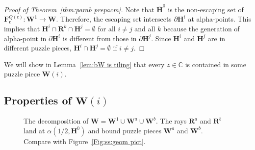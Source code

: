 \documentclass{amsart}
\newcommand{\1}{{\mathbb 1 }}
\newcommand{\bF}{{\mathbf F}}
\newcommand{\bW}{{\mathbf W}}
\newcommand{\bR}{{\mathbf R}}
\newcommand{\bH}{{\mathbf H}}
\newcommand{\rr}{\mathfrak{r}}
\newcommand{\C}{\mathbb{C}}
\theoremstyle{remark}
\numberwithin{equation}{section}
\theoremstyle{definition}
\theoremstyle{nonumberbreak}
\begin{document}
\begin{proof}[Proof of Theorem~\ref{thm:parab prepacm}]
 
Note that $\overline \bH^0$ is the non-escaping set of $\bF^{Q(\rr)}_\rr\colon \bW^1\to \bW.$ Therefore, the escaping set intersects $\partial \bH^i$ at alpha-points. This implies that $\bH^i\cap \bR^k\cap \bH^j=\emptyset$ for all $i\not=j$ and all $k$ because the generation of alpha-point in $\partial \bH^i$ is different from those in $\partial\bH^j$. Since $\bH^i$ and $\bH^j$ are in different puzzle pieces, $\bH^i\cap  \bH^j=\emptyset$ if $i\not=j$. 
 \end{proof}

We will show in Lemma~\ref{lem:bW is tiling} that every $z\in \C$ is contained in some puzzle piece $\bW(i)$.

\subsection{Properties of $\bW(i)$}





\begin{figure}
\caption{The decomposition of $\bW=\bW^1\cup \bW^a\cup \bW^b$. The rays $\bR^a$ and $\bR^b$ land at $\alpha(1/2,\bH^0)$ and bound puzzle pieces $\bW^a$ and $\bW^b$. Compare with Figure~\ref{Fig:ss:geom pict}.}
\label{fig:Decomp of bW}
\end{figure}
\end{document}
